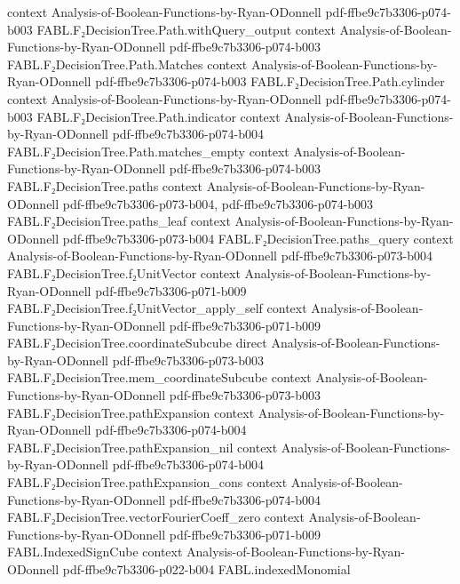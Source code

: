 \begin{theorem}
  {context}
  {Analysis-of-Boolean-Functions-by-Ryan-ODonnell}
  {pdf-ffbe9c7b3306-p074-b003}
\proofstep
  {FABL.F₂DecisionTree.Path.withQuery_output}
  {context}
  {Analysis-of-Boolean-Functions-by-Ryan-ODonnell}
  {pdf-ffbe9c7b3306-p074-b003}
\proofstep
  {FABL.F₂DecisionTree.Path.Matches}
  {context}
  {Analysis-of-Boolean-Functions-by-Ryan-ODonnell}
  {pdf-ffbe9c7b3306-p074-b003}
\proofstep
  {FABL.F₂DecisionTree.Path.cylinder}
  {context}
  {Analysis-of-Boolean-Functions-by-Ryan-ODonnell}
  {pdf-ffbe9c7b3306-p074-b003}
\proofstep
  {FABL.F₂DecisionTree.Path.indicator}
  {context}
  {Analysis-of-Boolean-Functions-by-Ryan-ODonnell}
  {pdf-ffbe9c7b3306-p074-b004}
\proofstep
  {FABL.F₂DecisionTree.Path.matches_empty}
  {context}
  {Analysis-of-Boolean-Functions-by-Ryan-ODonnell}
  {pdf-ffbe9c7b3306-p074-b003}
\proofstep
  {FABL.F₂DecisionTree.paths}
  {context}
  {Analysis-of-Boolean-Functions-by-Ryan-ODonnell}
  {pdf-ffbe9c7b3306-p073-b004,
    pdf-ffbe9c7b3306-p074-b003}
\proofstep
  {FABL.F₂DecisionTree.paths_leaf}
  {context}
  {Analysis-of-Boolean-Functions-by-Ryan-ODonnell}
  {pdf-ffbe9c7b3306-p073-b004}
\proofstep
  {FABL.F₂DecisionTree.paths_query}
  {context}
  {Analysis-of-Boolean-Functions-by-Ryan-ODonnell}
  {pdf-ffbe9c7b3306-p073-b004}
\proofstep
  {FABL.F₂DecisionTree.f₂UnitVector}
  {context}
  {Analysis-of-Boolean-Functions-by-Ryan-ODonnell}
  {pdf-ffbe9c7b3306-p071-b009}
\proofstep
  {FABL.F₂DecisionTree.f₂UnitVector_apply_self}
  {context}
  {Analysis-of-Boolean-Functions-by-Ryan-ODonnell}
  {pdf-ffbe9c7b3306-p071-b009}
\proofstep
  {FABL.F₂DecisionTree.coordinateSubcube}
  {direct}
  {Analysis-of-Boolean-Functions-by-Ryan-ODonnell}
  {pdf-ffbe9c7b3306-p073-b003}
\proofstep
  {FABL.F₂DecisionTree.mem_coordinateSubcube}
  {context}
  {Analysis-of-Boolean-Functions-by-Ryan-ODonnell}
  {pdf-ffbe9c7b3306-p073-b003}
\proofstep
  {FABL.F₂DecisionTree.pathExpansion}
  {context}
  {Analysis-of-Boolean-Functions-by-Ryan-ODonnell}
  {pdf-ffbe9c7b3306-p074-b004}
\proofstep
  {FABL.F₂DecisionTree.pathExpansion_nil}
  {context}
  {Analysis-of-Boolean-Functions-by-Ryan-ODonnell}
  {pdf-ffbe9c7b3306-p074-b004}
\proofstep
  {FABL.F₂DecisionTree.pathExpansion_cons}
  {context}
  {Analysis-of-Boolean-Functions-by-Ryan-ODonnell}
  {pdf-ffbe9c7b3306-p074-b004}
\proofstep
  {FABL.F₂DecisionTree.vectorFourierCoeff_zero}
  {context}
  {Analysis-of-Boolean-Functions-by-Ryan-ODonnell}
  {pdf-ffbe9c7b3306-p071-b009}
\proofstep
  {FABL.IndexedSignCube}
  {context}
  {Analysis-of-Boolean-Functions-by-Ryan-ODonnell}
  {pdf-ffbe9c7b3306-p022-b004}
\proofstep
  {FABL.indexedMonomial}

\end{theorem}
